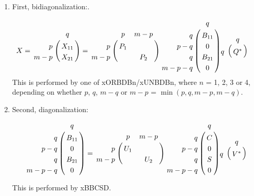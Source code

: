 \begin{enumerate}

\item First, bidiagonalization:.

\begin{eqnarray*}
X = \bordermatrix{        &     q      \cr
                              \hfill   p   & X_{11} \cr
                              \hfill m-p & X_{21} } &
     =  \bordermatrix{         &    p     &    m-p   \cr
                              \hfill   p   & P_{1} &             \cr
                              \hfill m-p &            & P_{2}  }
            \bordermatrix{            &       q      \cr
                              \hfill     q    &   B_{11} \cr 
                              \hfill   p-q  &    0          \cr 
                              \hfill     q    &  B_{21}  \cr
                              \hfill m-p-q &  0           }
           \bordermatrix{         &   q     \cr
                              \hfill   q   & Q^* }
 \end{eqnarray*}
This is performed by one of xORBDBn/xUNBDBn,
where $n$ = 1, 2, 3 or 4, depending on whether $p$, $q$, $m-q$ or $m-p$
= $\min(p,q,m-p,m-q)$.
 
\item Second, diagonalization:

\begin{eqnarray*}
            \bordermatrix{            &       q      \cr
                              \hfill     q    &   B_{11} \cr 
                              \hfill   p-q  &    0          \cr 
                              \hfill     q    &  B_{21}  \cr
                              \hfill m-p-q &  0           }
     = \bordermatrix{         &    p     &    m-p   \cr
                              \hfill   p   & U_{1} &             \cr
                              \hfill m-p &            & U_{2}  }
            \bordermatrix{            &   q  \cr
                              \hfill     q    &   C  \cr 
                              \hfill   p-q   &   0  \cr 
                              \hfill     q    &   S  \cr
                              \hfill m-p-q &   0  }
           \bordermatrix{        &     q      \cr
                              \hfill   q   &   V^* }
 \end{eqnarray*}

This is performed by xBBCSD.

\end{enumerate}

